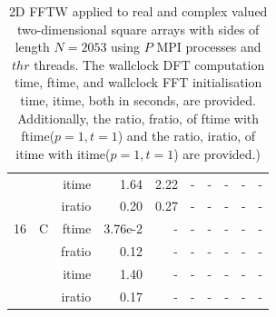 \documentclass[a4paper]{article}
\begin{document}
\begin{table}[htbp]
\begin{center}
\begin{small}
\begin{tabular}{|r|r|r|r|r|r|r|r|r|r|}
           &            &  itime &   1.64  &    2.22  &   - &   - &   - &   - &   - \\
           &            &  iratio &   0.20 &    0.27 &   - &   - &   - &   - &   -  \\\hline
   16 &   C &   ftime &   3.76e-2 &   - &   - &   - &   - &   - &   - \\
           &            &  fratio &   0.12 &   - &   - &   - &   - &   - &   - \\
           &            &  itime &   1.40  &   - &   - &   - &   - &   - &   - \\
           &            &  iratio &   0.17 &   - &   - &   - &   - &   - &   -   \\\hline
\end{tabular}
\caption{2D FFTW applied to real and complex valued two-dimensional square arrays with sides of length $N=2053$ using $P$ MPI processes and $thr$ threads. The wallclock DFT computation time, ftime, and wallclock FFT initialisation time, itime, both in seconds, are provided. Additionally, the ratio, fratio, of ftime  with ftime($p=1,t=1$) and the ratio, iratio, of itime  with itime($p=1,t=1$) are provided.) }\label{Tbl:FFTW2d2053}
\end{small}
\end{center}
\end{table}
\end{document}
